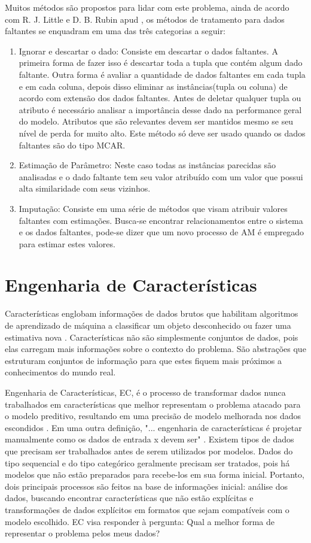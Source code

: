 Muitos métodos são propostos para lidar com este problema, ainda de acordo com  R. J. Little e D. B. Rubin apud , os métodos de tratamento para dados faltantes se enquadram em uma das três categorias a seguir:

\begin{enumerate}
\item Ignorar e descartar o dado: Consiste em descartar o dados faltantes. A primeira forma de fazer isso é descartar toda a tupla que contém algum dado faltante. Outra forma é avaliar a quantidade de dados faltantes em cada tupla e em cada coluna, depois disso eliminar as instâncias(tupla ou coluna) de acordo com extensão dos dados faltantes. Antes de deletar qualquer tupla ou atributo é necessário analisar a importância desse dado na performance geral do modelo. Atributos que são relevantes devem ser mantidos mesmo se seu nível de perda for muito alto. Este método só deve ser usado quando os dados faltantes são do tipo MCAR.
\item Estimação de Parâmetro: Neste caso todas as instâncias parecidas são analisadas e o dado faltante tem seu valor atribuído com um valor que possui alta similaridade com seus vizinhos.
\item Imputação: Consiste em uma série de métodos que visam atribuir valores faltantes com estimações. Busca-se encontrar relacionamentos entre o sistema e os dados faltantes, pode-se dizer que um novo processo de AM é empregado para estimar estes valores.
\end{enumerate}


\section{Engenharia de Características}

Características englobam informações de dados brutos que habilitam algoritmos de aprendizado de máquina a classificar um objeto desconhecido ou fazer uma estimativa nova \cite{brain2013}. Características não são simplesmente conjuntos de dados, pois elas carregam mais informações sobre o contexto do problema. São abstrações que estruturam conjuntos de informação para que estes fiquem mais próximos a conhecimentos do mundo real.   

Engenharia de Características, EC, é o processo de transformar dados nunca trabalhados em características que melhor representam o problema atacado para o modelo preditivo, resultando em uma precisão de modelo melhorada nos dados escondidos \cite{fe2014}. Em uma outra definição, "... engenharia de características é projetar manualmente como os dados de entrada x devem ser" \cite{tomas2014}. Existem tipos de dados que precisam ser trabalhados antes de serem utilizados por modelos. Dados do tipo sequencial e do tipo categórico geralmente precisam ser tratados, pois há modelos que não estão preparados para recebe-los em sua forma inicial. Portanto, dois principais processos são feitos na base de informações inicial: análise dos dados, buscando encontrar características que não estão explícitas e transformações de dados explícitos em formatos que sejam compatíveis com o modelo escolhido. EC visa responder à pergunta: Qual a melhor forma de representar o problema pelos meus dados?

